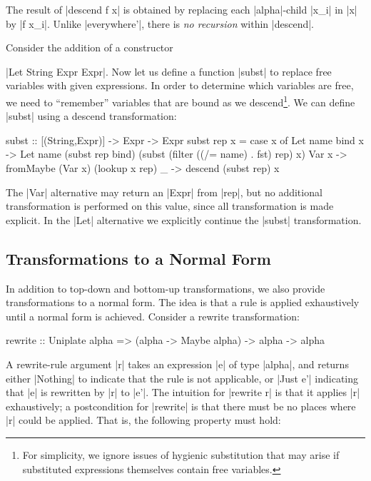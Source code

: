 The result of |descend f x| is obtained by replacing each |alpha|-child |x_i| in |x| by |f x_i|. Unlike |everywhere'|, there is \textit{no recursion} within |descend|.

\begin{comment}
\begin{code}
data Expr = Var String | Let String Expr Expr | Add Expr Expr
\end{code}
\end{comment}

\begin{example}
Consider the addition of a constructor \ignore|Let String Expr Expr|. Now let us define a function |subst| to replace free variables with given expressions. In order to determine which variables are free, we need to ``remember'' variables that are bound as we descend\footnote{For simplicity, we ignore issues of hygienic substitution that may arise if substituted expressions themselves contain free variables.}. We can define |subst| using a descend transformation:

\begin{code}
subst :: [(String,Expr)] -> Expr -> Expr
subst rep x =
    case  x of
          Let name bind x -> Let name (subst rep bind)
              (subst (filter ((/= name) . fst) rep) x)
          Var x -> fromMaybe (Var x) (lookup x rep)
          _ -> descend (subst rep) x
\end{code}

The |Var| alternative may return an |Expr| from |rep|, but no additional transformation is performed on this value, since all transformation is made explicit. In the |Let| alternative we explicitly continue the |subst| transformation.
\end{example}

\subsection{Transformations to a Normal Form}

In addition to top-down and bottom-up transformations, we also provide transformations to a normal form. The idea is that a rule is applied exhaustively until a normal form is achieved. Consider a rewrite transformation:

\begin{code}
rewrite :: Uniplate alpha => (alpha -> Maybe alpha) -> alpha -> alpha
\end{code}

A rewrite-rule argument |r| takes an expression |e| of type |alpha|, and returns either |Nothing| to indicate that the rule is not applicable, or |Just e'| indicating that |e| is rewritten by |r| to |e'|. The intuition for |rewrite r| is that it applies |r| exhaustively; a postcondition for |rewrite| is that there must be no places where |r| could be applied. That is, the following property must hold:


